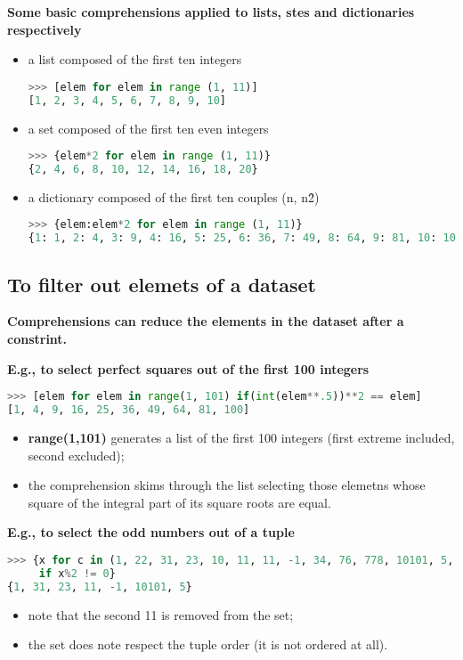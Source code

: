 \textbf{Some basic comprehensions applied to lists, stes and dictionaries respectively}
\begin{itemize}
	\item a list composed of the first ten integers
\begin{lstlisting}[language=Python]
>>> [elem for elem in range (1, 11)]
[1, 2, 3, 4, 5, 6, 7, 8, 9, 10]
\end{lstlisting}
	\item a set composed of the first ten even integers
\begin{lstlisting}[language=Python]
>>> {elem*2 for elem in range (1, 11)}
{2, 4, 6, 8, 10, 12, 14, 16, 18, 20}
\end{lstlisting}
	\item a dictionary composed of the first ten couples (n, n\^2)
\begin{lstlisting}[language=Python]
>>> {elem:elem*2 for elem in range (1, 11)}
{1: 1, 2: 4, 3: 9, 4: 16, 5: 25, 6: 36, 7: 49, 8: 64, 9: 81, 10: 100}
\end{lstlisting}
\end{itemize}

\subsection{To filter out elemets of a dataset}
\textbf{Comprehensions can reduce the elements in the dataset after a constrint.}

\textbf{E.g., to select perfect squares out of the first 100 integers}
\begin{lstlisting}[language=Python]
>>> [elem for elem in range(1, 101) if(int(elem**.5))**2 == elem]
[1, 4, 9, 16, 25, 36, 49, 64, 81, 100]
\end{lstlisting}
\begin{itemize}
	\item \textbf{range(1,101)} generates a list of the first 100 integers (first extreme included, second excluded);
	\item the comprehension skims through the list selecting those elemetns whose square of the integral part of its square roots are equal.
\end{itemize}
\textbf{E.g., to select the odd numbers out of a tuple}
\begin{lstlisting}[language=Python]
>>> {x for c in (1, 22, 31, 23, 10, 11, 11, -1, 34, 76, 778, 10101, 5, 44) 
     if x%2 != 0}
{1, 31, 23, 11, -1, 10101, 5}
\end{lstlisting}
\begin{itemize}
	\item note that the second 11 is removed from the set;
	\item the set does note respect the tuple order (it is not ordered at all).
\end{itemize}

